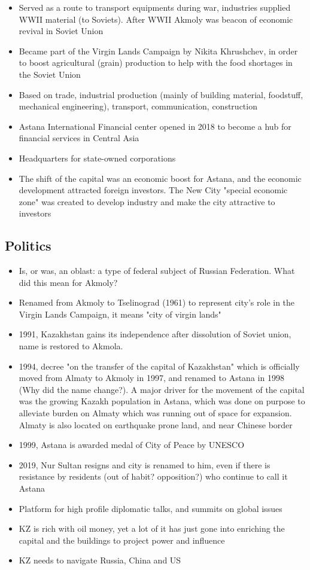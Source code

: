 \documentclass[11pt]{article}
\begin{document}
\begin{itemize}
  \item Served as a route to transport equipments during war, industries supplied WWII material (to Soviets). After WWII Akmoly was beacon of economic revival in Soviet Union
  \item Became part of the Virgin Lands Campaign by Nikita Khrushchev, in order to boost agricultural (grain) production to help with the food shortages in the Soviet Union
  \item Based on trade, industrial production (mainly of building material, foodstuff, mechanical engineering), transport, communication, construction
  \item Astana International Financial center opened in 2018 to become a hub for financial services in Central Asia
  \item Headquarters for state-owned corporations
  \item The shift of the capital was an economic boost for Astana, and the economic development attracted foreign investors. The New City "special economic zone" was created to develop industry and make the city attractive to investors
\end{itemize}

\subsection{Politics}

\begin{itemize}
  \item Is, or was, an oblast: a type of federal subject of Russian Federation. What did this mean for Akmoly? 
  \item Renamed from Akmoly to Tselinograd (1961) to represent city's role in the Virgin Lands Campaign, it means "city of virgin lands"
  \item 1991, Kazakhstan gains its independence after dissolution of Soviet union, name is restored to Akmola.
  \item 1994, decree "on the transfer of the capital of Kazakhstan" which is officially moved from Almaty to Akmoly in 1997, and renamed to Astana in 1998 (Why did the name change?). A major driver for the movement of the capital was the growing Kazakh population in Astana, which was done on purpose to alleviate burden on Almaty which was running out of space for expansion. Almaty is also located on earthquake prone land, and near Chinese border
  \item 1999, Astana is awarded medal of City of Peace by UNESCO
  \item 2019, Nur Sultan resigns and city is renamed to him, even if there is resistance by residents (out of habit? opposition?) who continue to call it Astana
  \item Platform for high profile diplomatic talks, and summits on global issues
  \item KZ is rich with oil money, yet a lot of it has just gone into enriching the capital and the buildings to project power and influence
  \item KZ needs to navigate Russia, China and US 
\end{itemize}
\end{document}
